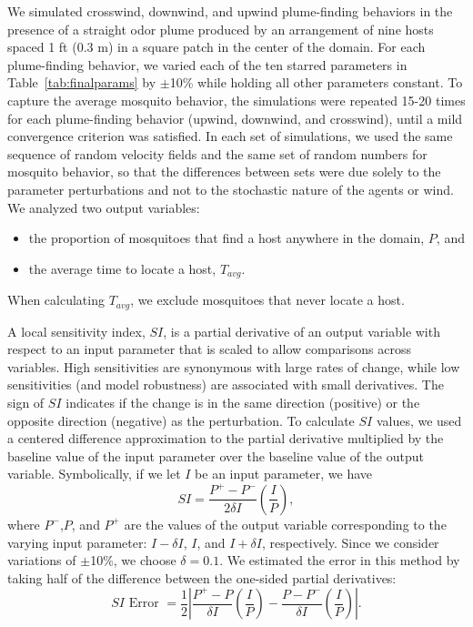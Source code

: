 \documentclass[10pt]{article}
\begin{document}
We simulated crosswind, downwind, and upwind plume-finding behaviors in the presence of a straight odor plume produced by an arrangement of nine hosts spaced 1 ft (0.3 m) in a  square patch in the center of the domain. For each plume-finding behavior, we varied each of the ten starred parameters in Table~\ref{tab:finalparams} by $\pm$10\% while holding all other parameters constant. To capture the average mosquito behavior, the simulations were repeated 15-20 times for each plume-finding behavior (upwind, downwind, and crosswind), until a mild convergence criterion was satisfied. In each set of simulations, we used the same sequence of random velocity fields and the same set of random numbers for mosquito behavior, so that the differences between sets were due solely to the parameter perturbations and not to the stochastic nature of the agents or wind.
%
We analyzed two output variables:
\begin{itemize}
\item the proportion of mosquitoes that find a host anywhere in the domain, $P$, and
\item the average time to locate a host, $T_{avg}$.
\end{itemize}
When calculating $T_{avg}$, we exclude mosquitoes that never locate a host.

A local sensitivity index, $SI$, is a partial derivative of an output variable with respect to an input parameter that is scaled to allow comparisons across variables. High sensitivities are synonymous with large rates of change, while low sensitivities (and model robustness) are associated with small derivatives. The sign of $SI$ indicates if the change is in the same direction (positive) or the opposite direction (negative) as the perturbation. To calculate $SI$ values, we used a centered difference approximation to the partial derivative multiplied by the baseline value of the input parameter over the baseline value of the output variable. Symbolically, if we let $I$ be an input parameter, we have
\begin{equation}
	SI = \frac{P^+ - P^-}{2\delta I}\left(\frac{I}{P}\right), \label{eqn:SI}
\end{equation}
where $P^-$,$P$, and $P^+$ are the values of the output variable corresponding to the varying input parameter: $I - \delta I$, $I$, and $I + \delta I$, respectively. Since we consider variations of $\pm$10\%, we choose $\delta = 0.1$.
We estimated the error in this method by taking half of the difference between the one-sided partial derivatives:
\begin{equation}
	SI \text{ Error } = \frac{1}{2}\left|\frac{P^+ - P}{\delta I}\left(\frac{I}{P}\right) - \frac{P - P^-}{\delta I}\left(\frac{I}{P}\right) \right|. \label{eqn:SIerr}
\end{equation}
\end{document}
